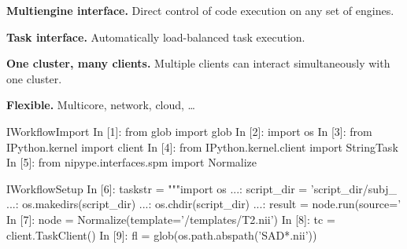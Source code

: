 \documentclass[portrait,final]{baposter}
\newcommand{\compresslist}{%
\setlength{\itemsep}{1pt}%
\setlength{\parskip}{0pt}%
\setlength{\parsep}{0pt}%
}
\begin{document}
\begin{poster}
{    \begin{center}
    \end{center}

    \begin{list}{}{\leftmargin=1em}
      \compresslist
    \item \textbf{Multiengine interface.} Direct control of code execution on
      any set of engines.
    \item \textbf{Task interface.} Automatically load-balanced task execution.
    \item \textbf{One cluster, many clients.} Multiple clients can interact
      simultaneously with one cluster.
    \item \textbf{Flexible.} Multicore, network, cloud, \ldots
  \end{list}

    
\vspace{-0.3em}
  }

\begin{SaveVerbatim}{IWorkflowImport}
In [1]: from glob import glob
In [2]: import os
In [3]: from IPython.kernel import client
In [4]: from IPython.kernel.client import StringTask
In [5]: from nipype.interfaces.spm import Normalize
\end{SaveVerbatim}

\begin{SaveVerbatim}{IWorkflowSetup}
In [6]: taskstr = """import os
   ...: script_dir = 'script_dir/subj_%
   ...: os.makedirs(script_dir)
   ...: os.chdir(script_dir)
   ...: result = node.run(source='%
In [7]: node = Normalize(template='/templates/T2.nii')
In [8]: tc = client.TaskClient()
In [9]: fl = glob(os.path.abspath('SAD*.nii'))
\end{SaveVerbatim}


\end{poster}
\end{document}
